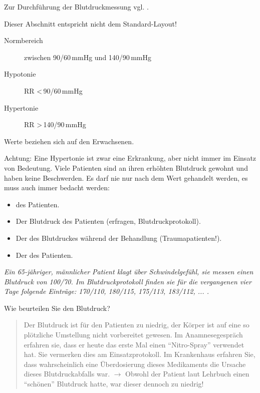 Zur Durchführung der Blutdruckmessung vgl.
.



   {Dieser Abschnitt entspricht nicht dem Standard-Layout!
}
\begin{description}
    \item[Normbereich] zwischen 90/60\,mmHg und
    140/90\,mmHg 
    \item[Hypotonie] RR {\textless}\,90/60\,mmHg
    \item[Hypertonie] RR {\textgreater}\,140/90\,mmHg
\end{description}

{\tiny Werte beziehen sich auf den Erwachsenen.}

Achtung: Eine Hypertonie ist zwar eine Erkrankung, aber nicht immer im
Einsatz von Bedeutung. Viele Patienten sind an ihren erhöhten
Blutdruck gewohnt und haben keine Beschwerden. Es darf nie nur nach dem
Wert gehandelt werden, es muss auch immer bedacht werden: 

\begin{itemize}
    \item {} des Patienten.
    \item Der  Blutdruck des Patienten
    (erfragen, Blutdruckprotokoll).
    \item Der  des Blutdruckes während der
    Behandlung (Traumapatienten!).
    \item Der  des Patienten.
\end{itemize}


\emph{Ein 65-jähriger, männlicher Patient klagt über
Schwindelgefühl, sie messen einen Blutdruck von 100/70. Im Blutdruckprotokoll finden sie
für die vergangenen vier Tage folgende Einträge: 170/110, 180/115,
175/113, 183/112, ... .}


Wie beurteilen Sie den Blutdruck?

\begin{quote}
Der Blutdruck ist für den Patienten zu niedrig, der Körper ist auf
eine so plötzliche Umstellung nicht vorbereitet gewesen. Im
Anamnesegespräch erfahren sie, dass er heute das erste Mal einen
"`Nitro-Spray"' verwendet hat. Sie
vermerken dies am Einsatzprotokoll. Im Krankenhaus erfahren Sie, dass
wahrscheinlich eine Überdosierung dieses Medikaments die Ursache
dieses Blutdruckabfalls war. ${\rightarrow}$ Obwohl der Patient laut
Lehrbuch einen "`schönen"' Blutdruck
hatte, war dieser dennoch zu niedrig!
\end{quote}

